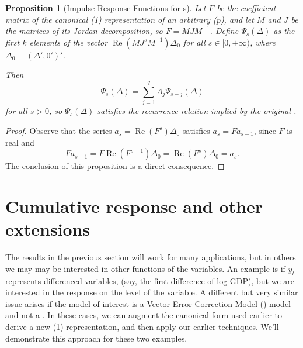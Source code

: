 \documentclass[12pt,fleqn]{article}
\renewcommand{\Re}{\operatorname{Re}}
\newcommand{\VECM}{\allcaps{VECM}}
\newtheorem{prop}{Proposition}
\begin{document}
\begin{prop}[Impulse Response Functions for \VAR s]\label{prop1}
  Let $F$ be the coefficient matrix of the canonical \VAR(1)
  representation of an arbitrary \VAR($p$), and let $M$ and $J$ be the
  matrices of its Jordan decomposition, so $F = M J
  M^{-1}$. Define $\Psi_s(\Delta)$ as the first $k$ elements of the
  vector $\Re(M J^s M^{-1}) \Delta_0$ for all $s \in [0,+\infty)$, where
  $\Delta_0 = (\Delta', 0')'$.

  Then
  \begin{equation*}
    \Psi_s(\Delta) = \sum_{j=1}^q A_j \Psi_{s-j}(\Delta)
  \end{equation*}
  for all $s > 0$, so $\Psi_s(\Delta)$ satisfies the recurrence
  relation implied by the original \VAR.
\end{prop}
\begin{proof}
  Observe that the series $a_s = \Re(F^s) \Delta_0$ satisfies
  $a_s = F a_{s-1}$, since $F$ is real and
  \[
    F a_{s-1} = F \Re(F^{s-1}) \Delta_0
    = \Re(F^s) \Delta_0
    = a_s.
  \]
  The conclusion of this proposition is a direct consequence.
\end{proof}

\section[Extensions]{Cumulative response and other extensions}
\label{extensions}

The results in the previous section will work for many applications,
but in others we may may be interested in other functions of the
variables. An example is if $y_t$ represents differenced variables,
(say, the first difference of log GDP), but we are interested in the
response on the level of the variable. A different but very similar
issue arises if the model of interest is a Vector Error Correction
Model (\VECM) model and not a \VAR. In these cases, we can augment the
canonical form used earlier to derive a new \VAR(1) representation,
and then apply our earlier techniques. We'll demonstrate this approach
for these two examples.
\end{document}
